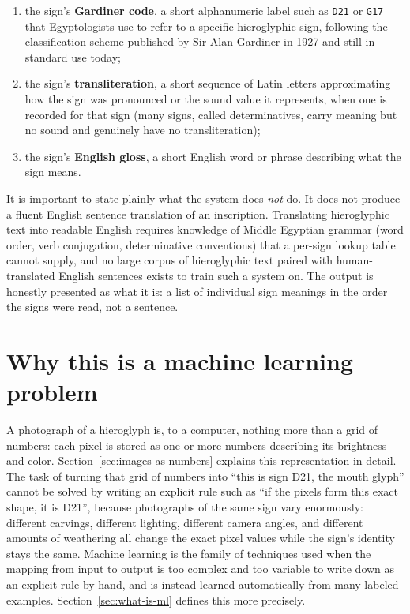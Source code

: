 \documentclass[11pt,a4paper]{report}
\begin{document}
\begin{enumerate}[label=(\arabic*)]
  \item the sign's \textbf{Gardiner code}, a short alphanumeric label such as
    \texttt{D21} or \texttt{G17} that Egyptologists use to refer to a specific
    hieroglyphic sign, following the classification scheme published by Sir
    Alan Gardiner in 1927 and still in standard use today;
  \item the sign's \textbf{transliteration}, a short sequence of Latin letters
    approximating how the sign was pronounced or the sound value it
    represents, when one is recorded for that sign (many signs, called
    determinatives, carry meaning but no sound and genuinely have no
    transliteration);
  \item the sign's \textbf{English gloss}, a short English word or phrase
    describing what the sign means.
\end{enumerate}

It is important to state plainly what the system does \emph{not} do. It does
not produce a fluent English sentence translation of an inscription.
Translating hieroglyphic text into readable English requires knowledge of
Middle Egyptian grammar (word order, verb conjugation, determinative
conventions) that a per-sign lookup table cannot supply, and no large corpus
of hieroglyphic text paired with human-translated English sentences exists to
train such a system on. The output is honestly presented as what it is: a
list of individual sign meanings in the order the signs were read, not a
sentence.

\section{Why this is a machine learning problem}

A photograph of a hieroglyph is, to a computer, nothing more than a grid of
numbers: each pixel is stored as one or more numbers describing its
brightness and color. Section~\ref{sec:images-as-numbers} explains this
representation in detail. The task of turning that grid of numbers into
``this is sign D21, the mouth glyph'' cannot be solved by writing an explicit
rule such as ``if the pixels form this exact shape, it is D21'', because
photographs of the same sign vary enormously: different carvings, different
lighting, different camera angles, and different amounts of weathering all
change the exact pixel values while the sign's identity stays the same.
Machine learning is the family of techniques used when the mapping from
input to output is too complex and too variable to write down as an explicit
rule by hand, and is instead learned automatically from many labeled
examples. Section~\ref{sec:what-is-ml} defines this more precisely.
\end{document}
